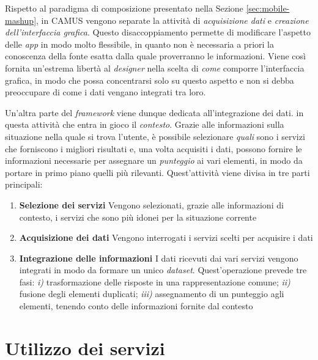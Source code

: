 Rispetto al paradigma di composizione presentato nella Sezione \ref{sec:mobile-mashup}, in CAMUS vengono separate la attività di \emph{acquisizione dati} e \emph{creazione dell'interfaccia grafica}. Questo disaccoppiamento permette di modificare l'aspetto delle \emph{app} in modo molto flessibile, in quanto non è necessaria a priori la conoscenza della fonte esatta dalla quale proverranno le informazioni. Viene così fornita un'estrema libertà al \emph{designer} nella scelta di \emph{come} comporre l'interfaccia grafica, in modo che possa concentrarsi solo su questo aspetto e non si debba preoccupare di come i dati vengano integrati tra loro.

Un'altra parte del \emph{framework} viene dunque dedicata all'integrazione dei dati. \upe in questa attività che entra in gioco il \emph{contesto}. Grazie alle informazioni sulla situazione nella quale si trova l'utente, è possibile selezionare \emph{quali} sono i servizi che forniscono i migliori risultati e, una volta acquisiti i dati, possono fornire le informazioni necessarie per assegnare un \emph{punteggio} ai vari elementi, in modo da portare in primo piano quelli più rilevanti. Quest'attività viene divisa in tre parti principali:

\begin{enumerate}
	\item \textbf{Selezione dei servizi}
	Vengono selezionati, grazie alle informazioni di contesto, i servizi che sono più idonei per la situazione corrente
	\item \textbf{Acquisizione dei dati}
	Vengono interrogati i servizi scelti per acquisire i dati
	\item \textbf{Integrazione delle informazioni}
	I dati ricevuti dai vari servizi vengono integrati in modo da formare un unico \emph{dataset}. Quest'operazione prevede tre fasi: \emph{i)} trasformazione delle risposte in una rappresentazione comune; \emph{ii)} fusione degli elementi duplicati; \emph{iii)} assegnamento di un punteggio agli elementi, tenendo conto delle informazioni fornite dal contesto
\end{enumerate}

\section{Utilizzo dei servizi\label{sec:utilizzo-servizi}}

